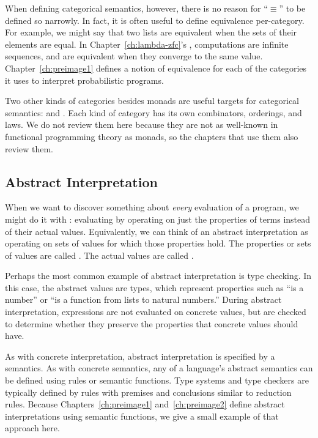When defining categorical semantics, however, there is no reason for ``$\equiv$'' to be defined so narrowly.
In fact, it is often useful to define equivalence per-category.
For example, we might say that two lists are equivalent when the sets of their elements are equal.
In Chapter~\ref{ch:lambda-zfc}'s , computations are infinite sequences, and are equivalent when they converge to the same value.
Chapter~\ref{ch:preimage1} defines a notion of equivalence for each of the categories it uses to interpret probabilistic programs.

Two other kinds of categories besides monads are useful targets for categorical semantics:  and .
Each kind of category has its own combinators, orderings, and laws.
We do not review them here because they are not as well-known in functional programming theory as monads, so the chapters that use them also review them.


\subsection{Abstract Interpretation}

When we want to discover something about \emph{every} evaluation of a program, we might do it with : evaluating by operating on just the properties of terms instead of their actual values. Equivalently, we can think of an abstract interpretation as operating on sets of values for which those properties hold.
The properties or sets of values are called .
The actual values are called .

Perhaps the most common example of abstract interpretation is type checking.
In this case, the abstract values are types, which represent properties such as ``is a number'' or ``is a function from lists to natural numbers.''
During abstract interpretation, expressions are not evaluated on concrete values, but are checked to determine whether they preserve the properties that concrete values should have.

As with concrete interpretation, abstract interpretation is specified by a semantics.
As with concrete semantics, any of a language's abstract semantics can be defined using rules or semantic functions.
Type systems and type checkers are typically defined by rules with premises and conclusions similar to reduction rules.
Because Chapters~\ref{ch:preimage1} and~\ref{ch:preimage2} define abstract interpretations using semantic functions, we give a small example of that approach here.

